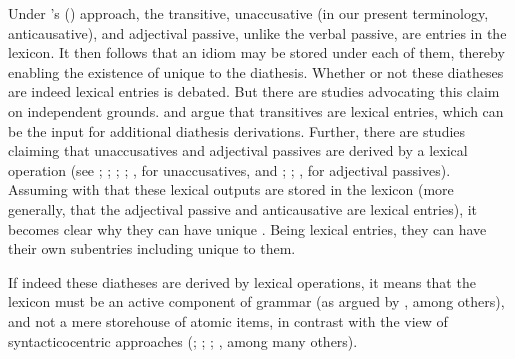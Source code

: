 \documentclass[output=paper]{langsci/langscibook}
\begin{document}
Under \citeauthor{HorSil2009}'s (\citeyear{HorSil2009,HorSil2019}) approach,
the transitive, unaccusative (in our present terminology,
anticausative), and adjectival passive, unlike the verbal passive, are entries
in the lexicon. It then follows that an idiom may be stored under each of them,
thereby enabling the existence of  unique to the diathesis. Whether
or not these diatheses are indeed lexical entries is debated. But there are
studies advocating this claim on independent grounds. \citet{HorSil2011} and
\citet{Reinhart2002} argue that transitives are lexical entries, which can be
the input for additional diathesis derivations. Further, there are studies
claiming that unaccusatives and adjectival passives are derived by a lexical
operation (see \citealt{Chierchia2004}; \citealt{HorSil2011};
\citealt{LevRapHov1995}; \citealt{Koontz-Garboden2009}; \citealt{Reinhart2002},
for unaccusatives, and \citealt{HorSil2008}; \citealt{LevRap1986};
\citealt{Meltzer-Asscher2011}, for adjectival passives). Assuming with
\textcite{HorSil2008,HorSil2011} that these lexical outputs are stored in the
lexicon (more generally, that the adjectival passive and anticausative are
lexical entries), it becomes clear why they can have unique . Being
lexical entries, they can have their own subentries including 
unique to them.

If indeed these diatheses are derived by lexical operations, it means that the
lexicon must be an active component of grammar (as argued by
\citealt{Reinhart2002}, \citealt{Siloni2002} among others), and not a mere
storehouse of atomic items, in contrast with the view of syntacticocentric
approaches (\citealt{Borer2005}; \citealt{Marantz1997};
\citealt{Pylkkanen2008}; \citealt{Ramchand2008}, among many others).
\end{document}
